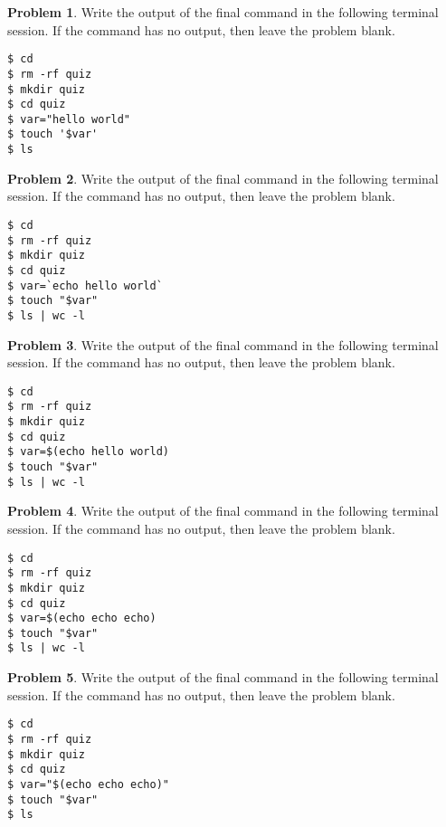 \documentclass[10pt]{article}
\theoremstyle{definition}
\newtheorem{problem}{Problem}
\begin{document}
\begin{problem}
    Write the output of the final command in the following terminal session.
    If the command has no output, then leave the problem blank.
\end{problem}
\begin{lstlisting}
$ cd
$ rm -rf quiz
$ mkdir quiz
$ cd quiz
$ var="hello world"
$ touch '$var'
$ ls
\end{lstlisting}
\vspace{0.4in}

\begin{problem}
    Write the output of the final command in the following terminal session.
    If the command has no output, then leave the problem blank.
\end{problem}
\begin{lstlisting}
$ cd
$ rm -rf quiz
$ mkdir quiz
$ cd quiz
$ var=`echo hello world`
$ touch "$var"
$ ls | wc -l
\end{lstlisting}
\vspace{0.4in}

\begin{problem}
    Write the output of the final command in the following terminal session.
    If the command has no output, then leave the problem blank.
\end{problem}
\begin{lstlisting}
$ cd
$ rm -rf quiz
$ mkdir quiz
$ cd quiz
$ var=$(echo hello world)
$ touch "$var"
$ ls | wc -l
\end{lstlisting}
\vspace{0.4in}

\begin{problem}
    Write the output of the final command in the following terminal session.
    If the command has no output, then leave the problem blank.
\end{problem}
\begin{lstlisting}
$ cd
$ rm -rf quiz
$ mkdir quiz
$ cd quiz
$ var=$(echo echo echo)
$ touch "$var"
$ ls | wc -l
\end{lstlisting}
\vspace{0.4in}


\begin{problem}
    Write the output of the final command in the following terminal session.
    If the command has no output, then leave the problem blank.
\end{problem}
\begin{lstlisting}
$ cd
$ rm -rf quiz
$ mkdir quiz
$ cd quiz
$ var="$(echo echo echo)"
$ touch "$var"
$ ls
\end{lstlisting}
\vspace{0.4in}
\end{document}
